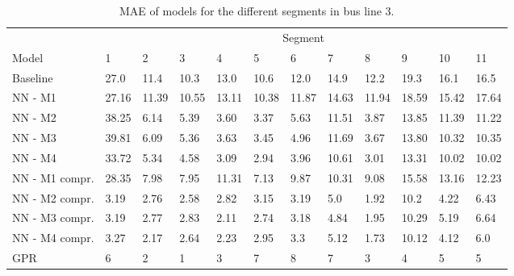 \begin{table}[H]
  \centering
  \caption{MAE of models for the different segments in bus line 3.}
  \label{tbl:model-mae-of-segs-203}
  \begin{adjustbox}{center}
  \begin{tabular}{ l | l | l | l | l | l | l | l | l | l | l | l }
    & \multicolumn{11}{c}{Segment} \\
    Model       & 1 & 2 & 3 & 4 & 5 & 6 & 7 & 8 & 9 & 10 & 11 \\
    \hline
    Baseline  & 27.0 & 11.4 & 10.3 & 13.0 & 10.6 & 12.0 & 14.9 & 12.2 & 19.3 & 16.1  & 16.5 \\
    NN - M1         & 27.16& 11.39& 10.55& 13.11& 10.38& 11.87& 14.63& 11.94& 18.59& 15.42& 17.64\\
    NN - M2         & 38.25 & 6.14 & 5.39 & 3.60 &  3.37 & 5.63 &  11.51 & 3.87 & 13.85 & 11.39  & 11.22\\
    NN - M3         & 39.81 & 6.09 & 5.36 & 3.63 &  3.45 & 4.96 &  11.69 & 3.67 & 13.80 & 10.32  & 10.35\\
    NN - M4         & 33.72 & 5.34 & 4.58 & 3.09 & 2.94 & 3.96 &  10.61 & 3.01 & 13.31 & 10.02  & 10.02\\
    NN - M1 compr.         & 28.35& 7.98& 7.95& 11.31& 7.13& 9.87& 10.31& 9.08& 15.58& 13.16& 12.23 \\ 
    NN - M2 compr.         & 3.19& 2.76& 2.58& 2.82& 3.15& 3.19& 5.0& 1.92& 10.2& 4.22& 6.43 \\
    NN - M3 compr.         & 3.19& 2.77& 2.83& 2.11& 2.74& 3.18& 4.84& 1.95& 10.29& 5.19& 6.64 \\
    NN - M4 compr.         & 3.27& 2.17& 2.64& 2.23& 2.95& 3.3& 5.12& 1.73& 10.12& 4.12& 6.0 \\
    GPR         & 6 & 2 & 1 & 3 &  7 & 8 &  7 & 3 & 4 & 5  & 5 \\
  \end{tabular}
  \end{adjustbox}
\end{table}

